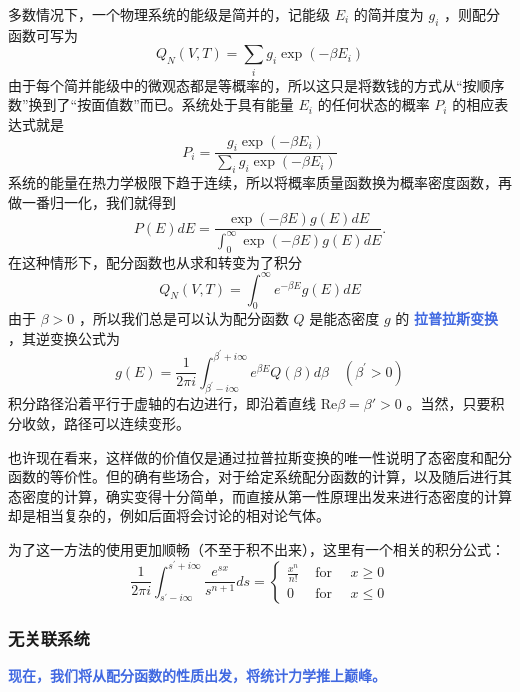 \documentclass[hyperref,UTF-8]{ctexart}
\newcommand{\0}{\boldsymbol{0}}
\begin{document}
多数情况下，一个物理系统的能级是简并的，记能级 $E_i$ 的简并度为 $g_i$ ，则配分函数可写为
\begin{equation}
    Q_N(V, T)=\sum_i g_i \exp \left(-\beta E_i\right)
\end{equation}
由于每个简并能级中的微观态都是等概率的，所以这只是将数钱的方式从“按顺序数”换到了“按面值数”而已。系统处于具有能量 $E_i$ 的任何状态的概率 $P_i$ 的相应表达式就是
\begin{equation}
    P_i=\frac{g_i \exp \left(-\beta E_i\right)}{\sum_i g_i \exp \left(-\beta E_i\right)}
\end{equation}
系统的能量在热力学极限下趋于连续，所以将概率质量函数换为概率密度函数，再做一番归一化，我们就得到
\begin{equation}
    P(E) d E=\frac{\exp (-\beta E) g(E) d E}{\int_0^{\infty} \exp (-\beta E) g(E) d E} .
\end{equation}
在这种情形下，配分函数也从求和转变为了积分
\begin{equation}
    Q_N(V, T)=\int_0^{\infty} e^{-\beta E} g(E) d E
\end{equation}
由于 $\beta>0$ ，所以我们总是可以认为配分函数 $Q$ 是能态密度 $g$ 的 \textcolor{RoyalBlue}{\textbf{\kaishu 拉普拉斯变换}} ，其逆变换公式为
\begin{equation}
    g(E)=\frac{1}{2 \pi i} \int_{\beta^{\prime}-i \infty}^{\beta^{\prime}+i \infty} e^{\beta E} Q(\beta) d \beta \quad\left(\beta^{\prime}>0\right)
\end{equation}
积分路径沿着平行于虚轴的右边进行，即沿着直线 $\text{Re}\beta = \beta' >0$ 。当然，只要积分收敛，路径可以连续变形。

也许现在看来，这样做的价值仅是通过拉普拉斯变换的唯一性说明了态密度和配分函数的等价性。但的确有些场合，对于给定系统配分函数的计算，以及随后进行其态密度的计算，确实变得十分简单，而直接从第一性原理出发来进行态密度的计算却是相当复杂的，例如后面将会讨论的相对论气体。

为了这一方法的使用更加顺畅（不至于积不出来），这里有一个相关的积分公式：
\[
    \frac{1}{2 \pi i} \int_{s^{\prime}-i \infty}^{s^{\prime}+i \infty} \frac{e^{s x}}{s^{n+1}} d s=\left\{\begin{array}{lll}
        \frac{x^n}{n !} & \text { for } \quad x \geq 0 \\
        0 & \text { for } \quad x \leq 0
        \end{array}\right.
\]
\subsubsection{无关联系统}
\textcolor{RoyalBlue}{\textbf{\kaishu 现在，我们将从配分函数的性质出发，将统计力学推上巅峰。}}
\end{document}

